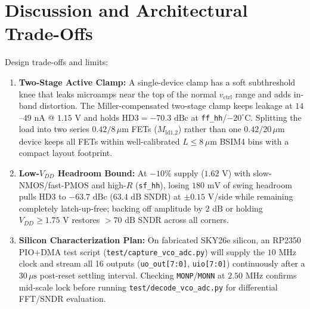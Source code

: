 \documentclass[10pt,twocolumn,letterpaper]{article}
\begin{document}
\section{Discussion and Architectural Trade-Offs}
Design trade-offs and limits:
\begin{enumerate}[leftmargin=1.2em,itemsep=1pt,topsep=1.5pt]
  \item \textbf{Two-Stage Active Clamp:} A single-device clamp has a soft subthreshold knee that leaks microamps near the top of the normal $v_{\text{ctrl}}$ range and adds in-band distortion. The Miller-compensated two-stage clamp keeps leakage at $14$--$49\text{ nA}$ @ $1.15\text{ V}$ and holds $\text{HD3}=-70.3\text{ dBc}$ at \texttt{ff\_hh}/$-20^\circ\text{C}$. Splitting the load into two series $0.42/8\,\mu\text{m}$ FETs ($M_{\text{ld1,2}}$) rather than one $0.42/20\,\mu\text{m}$ device keeps all FETs within well-calibrated $L\le8\,\mu\text{m}$ BSIM4 bins with a compact layout footprint.
  \item \textbf{Low-$V_{DD}$ Headroom Bound:} At $-10\%$ supply ($1.62\text{ V}$) with slow-NMOS/fast-PMOS and high-$R$ (\texttt{sf\_hh}), losing $180\text{ mV}$ of swing headroom pulls HD3 to $-63.7\text{ dBc}$ ($63.4\text{ dB}$ SNDR) at $\pm0.15\text{ V}$/side while remaining completely latch-up-free; backing off amplitude by $2\text{ dB}$ or holding $V_{DD}\ge1.75\text{ V}$ restores $>70\text{ dB}$ SNDR across all corners.
  \item \textbf{Silicon Characterization Plan:} On fabricated SKY26e silicon, an RP2350 PIO+DMA test script (\texttt{test/capture\_vco\_adc.py}) will supply the $10\text{ MHz}$ clock and stream all 16 outputs (\texttt{uo\_out[7:0]}, \texttt{uio[7:0]}) continuously after a $30\,\mu\text{s}$ post-reset settling interval. Checking \texttt{MONP}/\texttt{MONN} at $2.50\text{ MHz}$ confirms mid-scale lock before running \texttt{test/decode\_vco\_adc.py} for differential FFT/SNDR evaluation.
\end{enumerate}

\end{document}
